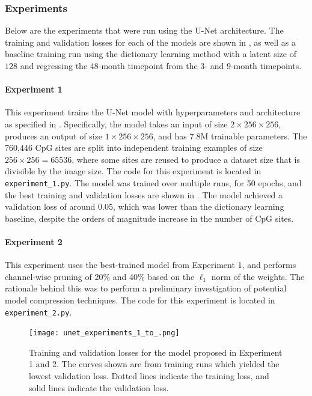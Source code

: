 \documentclass[twocolumn, 9pt]{extarticle}
\begin{document}
\subsubsection{Experiments}

Below are the experiments that were run using the U-Net architecture. The training and validation losses for each of the models are shown in , as well as a baseline training run using the dictionary learning method with a latent size of $128$ and regressing the 48-month timepoint from the 3- and 9-month timepoints.

\paragraph{Experiment 1} This experiment trains the U-Net model with hyperparameters and architecture as specified in \citet{ronneberger2015u}. Specifically, the model takes an input of size $2 \times 256 \times 256$, produces an output of size $1 \times 256 \times 256$, and has 7.8M trainable parameters. The 760,446 CpG sites are split into independent training examples of size $ 256 \times 256 = 65536$, where some sites are reused to produce a dataset size that is divisible by the image size. The code for this experiment is located in \texttt{experiment\_1.py}. The model was trained over multiple runs, for 50 epochs, and the best training and validation losses are shown in . The model achieved a validation loss of around $0.05$, which was lower than the dictionary learning baseline, despite the orders of magnitude increase in the number of CpG sites.

\paragraph{Experiment 2} This experiment uses the best-trained model from Experiment 1, and performs channel-wise pruning of 20\% and 40\% based on the $\ell_{1}$ norm of the weights. The rationale behind this was to perform a preliminary investigation of potential model compression techniques. The code for this experiment is located in \texttt{experiment\_2.py}.

\begin{figure}
  \centering
  \texttt{[image: unet\_experiments\_1\_to\_.png]}
  \caption{Training and validation losses for the model proposed in Experiment 1 and 2. The curves shown are from training runs which yielded the lowest validation loss. Dotted lines indicate the training loss, and solid lines indicate the validation loss.}
  \label{fig:losses_unet}
\end{figure}



\end{document}
